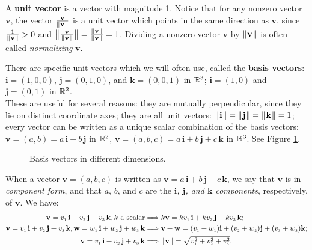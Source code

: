 A \textbf{unit vector} is a vector with magnitude 1.
Notice that for any nonzero vector $\mathbf{v}$, the vector $\frac{\mathbf{v}}{\lVert\mspace{1mu}\mathbf{v}\mspace{1mu}\rVert}$ is a unit vector which
points in the same direction as $\mathbf{v}$, since $\frac{1}{\lVert\mspace{1mu}\mathbf{v}\mspace{1mu}\rVert} > 0$ and
$\bigl\lVert\mspace{1mu}\frac{\mathbf{v}}{\lVert\mspace{1mu}\mathbf{v}\mspace{1mu}\rVert}\mspace{1mu}\bigr\rVert = \frac{\lVert\mspace{1mu}\mathbf{v}\mspace{1mu}\rVert}{\lVert\mspace{1mu}\mathbf{v}\mspace{1mu}\rVert} = 1$. Dividing a nonzero
vector $\mathbf{v}$ by $\lVert\mspace{1mu}\mathbf{v}\mspace{1mu}\rVert$ is often called \emph{normalizing} $\mathbf{v}$.

There are specific unit vectors which we will often use, called the \textbf{basis vectors}:\\
$\mathbf{i} = (1,0,0)$, $\mathbf{j} = (0,1,0)$, and $\mathbf{k} = (0,0,1)$ in $\mathbb{R}^{3}$;
$\mathbf{i} = (1,0)$ and $\mathbf{j} = (0,1)$ in $\mathbb{R}^{2}$. \\These are useful for several reasons: they are mutually
perpendicular, since they lie on distinct coordinate axes; they are all unit vectors: $\lVert\mspace{1mu}\mathbf{i}\mspace{1mu}\rVert =
\lVert\mspace{1mu}\mathbf{j}\mspace{1mu}\rVert = \lVert\mspace{1mu}\mathbf{k}\mspace{1mu}\rVert = 1$; every vector can be written as a unique scalar combination of the basis
vectors:
$\mathbf{v} = (a,b) = a\,\mathbf{i} + b\,\mathbf{j}$ in $\mathbb{R}^{2}$, $\mathbf{v} = (a,b,c) = a\,\mathbf{i} +
b\,\mathbf{j} + c\,\mathbf{k}$ in $\mathbb{R}^{3}$. See Figure \ref{fig:basis}.

\begin{figure}[h]
 \centering
 \quad
 \quad
 \quad
 \caption[]{\quad Basis vectors in different dimensions.}
 \label{fig:basis}
\end{figure}

When a vector $\mathbf{v} = (a,b,c)$ is written as $\mathbf{v} = a\,\mathbf{i} + b\,\mathbf{j} + c\,\mathbf{k}$, we say
that $\mathbf{v}$ is in \emph{component form}, and that $a$, $b$, and $c$ are the
\emph{$\mathbf{i}$, $\mathbf{j}$, and $\mathbf{k}$ components}, respectively, of $\mathbf{v}$. 
We have:
\begin{align*}
 \mathbf{v} = v_{\scriptscriptstyle 1}\,\textbf{i} + v_{\scriptscriptstyle 2}\,\textbf{j} + v_{\scriptscriptstyle 3}\,\textbf{k}, k \text{~a scalar} &\Longrightarrow k\mathbf{v} = kv_{\scriptscriptstyle 1}\,\textbf{i} + kv_{\scriptscriptstyle 2}\,\textbf{j} + kv_{\scriptscriptstyle 3}\,\textbf{k};\\
 \mathbf{v} = v_{\scriptscriptstyle 1}\,\textbf{i} + v_{\scriptscriptstyle 2}\,\textbf{j} + v_{\scriptscriptstyle 3}\,\textbf{k}, \mathbf{w} = w_{\scriptscriptstyle 1}\,\textbf{i} + w_{\scriptscriptstyle 2}\,\textbf{j} + w_{\scriptscriptstyle 3}\,\textbf{k} &\Longrightarrow \mathbf{v} + \mathbf{w} =
 (v_{\scriptscriptstyle 1} + w_{\scriptscriptstyle 1})\mathbf{i} + (v_{\scriptscriptstyle 2} + w_{\scriptscriptstyle 2})\mathbf{j} + (v_{\scriptscriptstyle 3} + w_{\scriptscriptstyle 3})\mathbf{k};\\
 \mathbf{v} = v_{\scriptscriptstyle 1}\,\textbf{i} + v_{\scriptscriptstyle 2}\,\textbf{j} + v_{\scriptscriptstyle 3}\,\textbf{k} &\Longrightarrow \lVert\mspace{1mu}\mathbf{v}\mspace{1mu}\rVert =
 \sqrt{v_{\scriptscriptstyle 1}^2 + v_{\scriptscriptstyle 2}^2 + v_{\scriptscriptstyle 3}^2}.
\end{align*}

